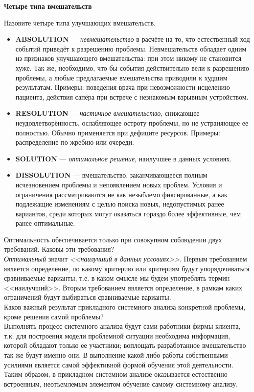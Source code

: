 \documentclass{article}
\newcommand{\note}[1]{\textit{#1}}
\newcommand{\important}[1]{\textbf{#1}}
\renewcommand{\subsection}[1]{
	\vspace{2em}
	\begin{flushright}
		\large
		\textbf{#1}
	\end{flushright}
	}
\begin{document}
\subsection{Четыре типа вмешательств}
Назовите четыре типа улучшающих вмешательств.
\begin{itemize}
	\item \important{ABSOLUTION} --- \note{невмешательство} в расчёте на то, что естественный ход событий приведёт к разрешению проблемы. Невмешательств обладает одним из признаков улучшающего вмешательства: при этом никому не становится хуже. Так же, необходимо, что бы события действительно вели к разрешению проблемы, а любые предлагаемые вмешательства приводили к худшим результатам. Примеры: поведения врача при невозможности исцелению пациента, действия сапёра при встрече с незнакомым взрывным устройством.
	\item \important{RESOLUTION} --- \note{частичное вмешательство}, снижающее неудовлетворённость, ослабляющее остроту проблемы, но не устраняющее ее полностью. Обычно применяется при дефиците ресурсов. Примеры: распределение по жребию или очереди.
	\item \important{SOLUTION} --- \note{оптимальное решение}, наилучшее в данных условиях. 
	\item \important{DISSOLUTION} --- вмешательство, заканчивающееся полным исчезновением проблемы и непоявлением новых проблем. Условия и ограничения рассматриваются не как незыблемо фиксированные, а как подлежащие изменениям с целью поиска новых, недопустимых ранее вариантов, среди которых могут оказаться гораздо более эффективные, чем ранее оптимальные.
\end{itemize}
Оптимальность обеспечивается только при совокупном соблюдении двух требований. Каковы эти требования?
\\
\note{Оптимальный} значит \note{<<наилучший в данных условиях>>}. Первым требованием является определение, по какому критерию или критериям будут упорядочиваться сравниваемые варианты, т.е. в каком смысле мы будем употреблять термин <<наилучший>>. Вторым требованием является определение, в рамкам каких ограничений будут выбираться сравниваемые варианты.
\\
Каков важный результат прикладного системного анализа конкретной проблемы, кроме решения самой проблемы?
\\
Выполнять процесс системного анализа будут сами работники фирмы клиента, т.к. для построения модели проблемной ситуации необходима информация, которой обладают только ее участники; воплощать разработанное вмешательство так же будут именно они. В выполнение какой-либо работы собственными усилиями является самой эффективной формой обучения этой деятельности. Таким образом, в прикладном системном анализе оказывается естественно встроенным, неотъемлемым элементом обучение самому системному анализу.
\end{document}
